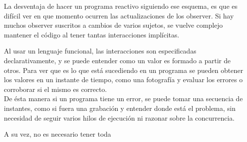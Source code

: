   La desventaja de hacer un programa reactivo siguiendo ese esquema, es que es difícil ver en que
momento ocurren las actualizaciones de los observer. Si hay muchos observer suscritos a cambios
de varios sujetos, se vuelve complejo mantener el código al tener tantas interacciones implícitas.

  Al usar un lenguaje funcional, las interacciones son especificadas declarativamente, y se puede
entender como un valor es formado a partir de otros.
  Para ver que es lo que está sucediendo en un programa se pueden obtener los valores en un instante
de tiempo, como una fotografía y evaluar los errores o corroborar si el mismo es correcto.\\
  De ésta manera si un programa tiene un error, se puede tomar una secuencia de instantes,
como si fuera una grabación y entender donde está el problema,
sin necesidad de seguir varios hilos de ejecución ni razonar sobre la concurrencia.

  A su vez, no es necesario tener toda

